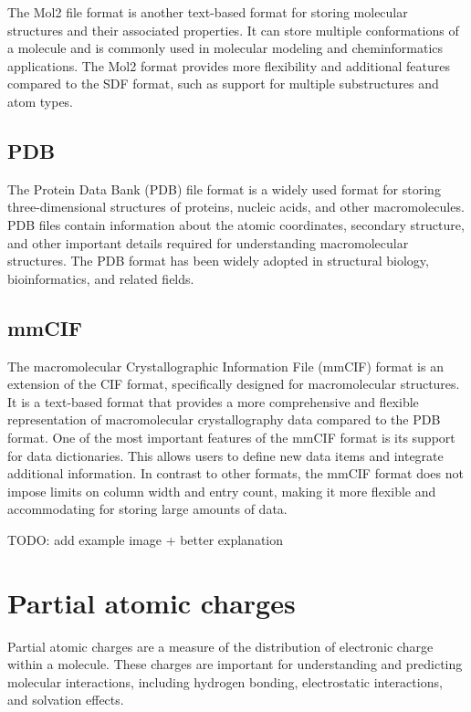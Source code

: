 \documentclass[
  digital,     %
  oneside,     %
  nosansbold,  %
  nocolorbold, %
  lof,         %
  lot,         %
]{fithesis4}
\begin{document}
The Mol2 file format is another text-based format for storing molecular structures and their associated properties. It can store multiple conformations of a molecule and is commonly used in molecular modeling and cheminformatics applications. The Mol2 format provides more flexibility and additional features compared to the SDF format, such as support for multiple substructures and atom types.

\subsection{PDB}
\label{subsection:pdb}

The Protein Data Bank (PDB) file format is a widely used format for storing three-dimensional structures of proteins, nucleic acids, and other macromolecules. PDB files contain information about the atomic coordinates, secondary structure, and other important details required for understanding macromolecular structures. The PDB format has been widely adopted in structural biology, bioinformatics, and related fields.

\subsection{mmCIF}
\label{subsection:mmcif}

The macromolecular Crystallographic Information File (mmCIF) format is an extension of the CIF format, specifically designed for macromolecular structures.
It is a text-based format that provides a more comprehensive and flexible representation of macromolecular crystallography data compared to the PDB format.
One of the most important features of the mmCIF format is its support for data dictionaries.
This allows users to define new data items and integrate additional information.
In contrast to other formats, the mmCIF format does not impose limits on column width and entry count, making it more flexible and accommodating for storing large amounts of data.

TODO: add example image + better explanation

\section{Partial atomic charges}
\label{section:partial_atomic_charges}

Partial atomic charges are a measure of the distribution of electronic charge within a molecule. These charges are important for understanding and predicting molecular interactions, including hydrogen bonding, electrostatic interactions, and solvation effects.
\end{document}

